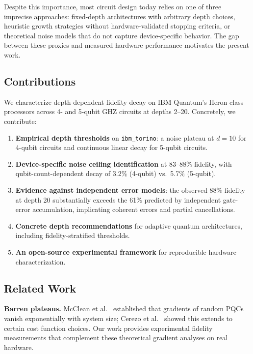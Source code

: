 \documentclass[12pt,letterpaper]{article}
\begin{document}
Despite this importance, most circuit design today relies on one of three imprecise
approaches: fixed-depth architectures with arbitrary depth choices, heuristic growth
strategies without hardware-validated stopping criteria, or theoretical noise models
that do not capture device-specific behavior. The gap between these proxies and
measured hardware performance motivates the present work.

\subsection{Contributions}

We characterize depth-dependent fidelity decay on IBM Quantum's Heron-class
processors across 4- and 5-qubit GHZ circuits at depths 2--20. Concretely, we
contribute:

\begin{enumerate}
  \item \textbf{Empirical depth thresholds} on \texttt{ibm\_torino}: a noise
        plateau at $d = 10$ for 4-qubit circuits and continuous linear decay for
        5-qubit circuits.
  \item \textbf{Device-specific noise ceiling identification} at 83--88\% fidelity,
        with qubit-count-dependent decay of 3.2\% (4-qubit) vs.\ 5.7\% (5-qubit).
  \item \textbf{Evidence against independent error models}: the observed 88\%
        fidelity at depth 20 substantially exceeds the 61\% predicted by independent
        gate-error accumulation, implicating coherent errors and partial cancellations.
  \item \textbf{Concrete depth recommendations} for adaptive quantum architectures,
        including fidelity-stratified thresholds.
  \item \textbf{An open-source experimental framework} for reproducible hardware
        characterization.
\end{enumerate}

\subsection{Related Work}

\textbf{Barren plateaus.}
McClean et al.~\cite{mcclean2018barren} established that gradients of random PQCs
vanish exponentially with system size; Cerezo et al.~\cite{cerezo2021cost} showed
this extends to certain cost function choices. Our work provides experimental
fidelity measurements that complement these theoretical gradient analyses on real
hardware.
\end{document}
